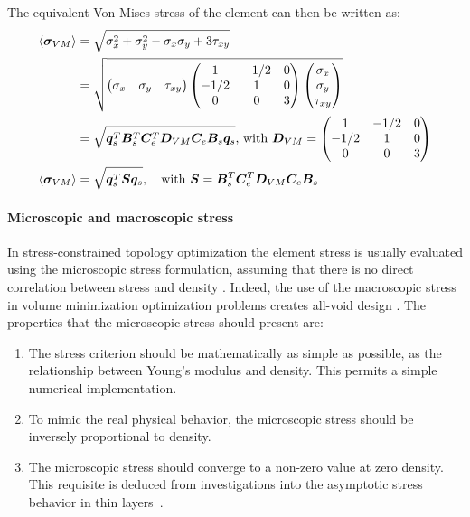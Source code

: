 The equivalent Von Mises stress of the element can then be written as:
\begin{align}
    \langle \bm{\sigma}_{VM} \rangle &= \sqrt{\sigma_x^2 + \sigma_y^2 - \sigma_x \sigma_y+3\tau_{xy}} \\
    &= \sqrt{
    \begin{pmatrix}
    \sigma_x & \sigma_y & \tau_{xy}
    \end{pmatrix}
    \begin{pmatrix}
    1       &   -1/2    &   0   \\
    -1/2    &   1       &   0   \\
    0       &   0       &   3
    \end{pmatrix}
    \begin{pmatrix}
    \sigma_x \\
    \sigma_y \\
    \tau_{xy}
    \end{pmatrix}} \\
    &= \sqrt{\bm{q}_s^T\bm{B}_s^T\bm{C}_e^T\bm{D}_{VM}\bm{C}_e\bm{B}_s\bm{q}_s}
    \textrm{,  with } \bm{D}_{VM} = 
    \begin{pmatrix}
    1       &   -1/2    &   0   \\
    -1/2    &   1       &   0   \\
    0       &   0       &   3
    \end{pmatrix} \\
    \langle \bm{\sigma}_{VM} \rangle &= \sqrt{\bm{q}_s^T\bm{S}\bm{q}_s}, \quad
    \textrm{with } \bm{S} = \bm{B}_s^T\bm{C}_e^T\bm{D}_{VM}\bm{C}_e\bm{B}_s
    \label{eq:03_VM_calc}
\end{align}

\paragraph{Microscopic and macroscopic stress}
In stress-constrained topology optimization the element stress is usually evaluated using the microscopic stress formulation, assuming that there is no direct correlation between stress and density . Indeed, the use of the macroscopic stress in volume minimization optimization problems creates all-void design . The properties that the microscopic stress should present are:
\begin{enumerate}[label=(\roman*)]
    \item The stress criterion should be mathematically as simple as possible, as the relationship between Young's modulus and density. This permits a simple numerical implementation.
    \item To mimic the real physical behavior, the microscopic stress should be inversely proportional to density.
    \item The microscopic stress should converge to a non-zero value at zero density. This requisite is deduced from investigations into the asymptotic stress behavior in thin layers~.
\end{enumerate}

